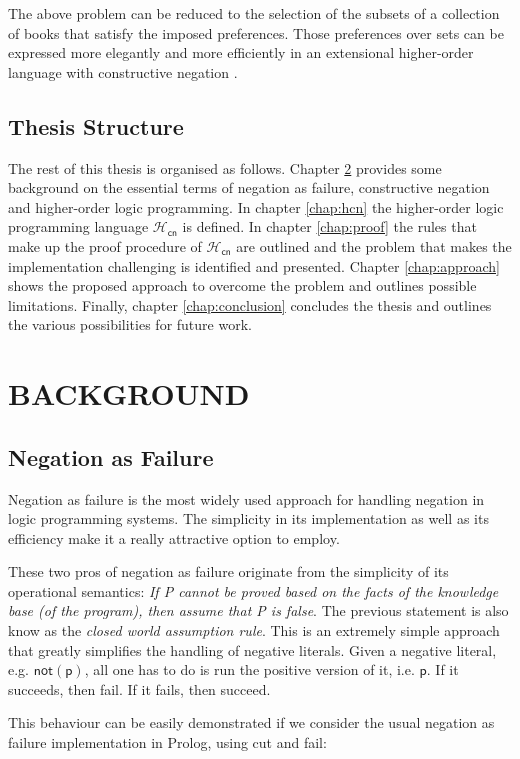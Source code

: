 \documentclass[inscr,ack,preface]{dithesis}
\theoremstyle{definition}
\newcommand{\hcn}{$\mathcal{H}_\mathsf{cn}$}
\newcommand{\msf}[1]{$\mathsf{#1}$}
\begin{document}
The above problem can be reduced to the selection of the subsets of a collection of books that satisfy the imposed preferences. Those preferences over sets can be expressed more elegantly and more efficiently in an extensional higher-order language with constructive negation \cite{DBLP:conf/ppdp/CharalambidisRT16}.

\section{Thesis Structure}
The rest of this thesis is organised as follows. Chapter \ref{chap:background} provides some background on the essential terms of negation as failure, constructive negation and higher-order logic programming. In chapter \ref{chap:hcn} the higher-order logic programming language \hcn{} is defined. In chapter \ref{chap:proof} the rules that make up the proof procedure of \hcn{} are outlined and the problem that makes the implementation challenging is identified and presented. Chapter \ref{chap:approach} shows the proposed approach to overcome the problem and outlines possible limitations. Finally, chapter \ref{chap:conclusion} concludes the thesis and outlines the various possibilities for future work.

\chapter{BACKGROUND}
\label{chap:background}

\section{Negation as Failure}
Negation as failure is the most widely used approach for handling negation in logic programming systems. The simplicity in its implementation as well as its efficiency make it a really attractive option to employ.

These two pros of negation as failure originate from the simplicity of its operational semantics: \emph{If P cannot be proved based on the facts of the knowledge base (of the program), then assume that P is false}. The previous statement is also know as the \emph{closed world assumption rule}. This is an extremely simple approach that greatly simplifies the handling of negative literals. Given a negative literal, e.g. \msf{not(p)}, all one has to do is run the positive version of it, i.e. \msf{p}. If it succeeds, then fail. If it fails, then succeed.

This behaviour can be easily demonstrated if we consider the usual negation as failure implementation in Prolog, using cut and fail:
\end{document}
